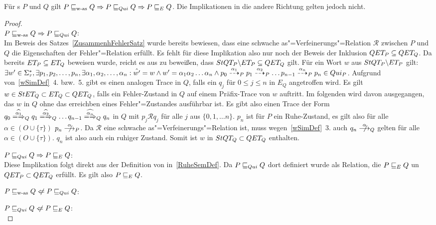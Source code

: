 \begin{Satz}
  Für \MEIO{}s $P$ und $Q$ gilt $P \sqsubseteq _{\mathrm{w}\text{-}\mathrm{as}} Q \Rightarrow P  \sqsubseteq  _{Qui} Q \Rightarrow
  P  \sqsubseteq  _E Q$. Die Implikationen in die andere Richtung gelten jedoch nicht.
\end{Satz}
\begin{proof}\mbox{}\\
  $P \sqsubseteq _{\mathrm{w}\text{-}\mathrm{as}} Q \Rightarrow P  \sqsubseteq  _{Qui} Q$:\\
  Im Beweis des Satzes~\ref{ZusammenhFehlerSatz} wurde bereits bewiesen, dass
  eine schwache as"=Verfeinerungs"=Relation $\mathcal{R}$ zwischen $P$ und $Q$
  die Eigenschaften der Fehler"=Relation \ERel{} erfüllt. Es fehlt für diese
  Implikation also nur noch der Beweis der Inklusion $QET _P \subseteq QET
  _Q$. Da bereits $ET _P\subseteq ET _Q$ beweisen wurde, reicht es aus zu
  beweißen, dass $StQT _P \backslash ET _P\subseteq QET _Q$ gilt. Für ein
  Wort $w$ aus $StQT _P \backslash ET _P$ gilt: $\exists w'\in\Sigma _{\tau}
  ^*, \exists p_1, p_2, \dots , p_n, \exists \alpha _1, \alpha _2, \dots
  ,\alpha _n: \hat{w'} = w \land w' = \alpha _1\alpha _2\dots\alpha _n \land
  p_0 \may[\alpha _1]_P p_1 \may[\alpha _2]_P \dots p_{n-1} \may[\alpha _n]_P
  p_n \in Qui _P$. Aufgrund von~\ref{wSimDef}~4. bzw.~5. gibt es einen analogen
  Trace in $Q$, falls ein $q_j$ für $0\leq j \leq n$ in $E_Q$ angetroffen wird.
  Es gilt $w\in StET _Q\subset ET _Q\subset QET _Q$, falls ein Fehler-Zustand
  in $Q$ auf einem Präfix-Trace von $w$ auftritt. Im folgenden wird davon
  ausgegangen, das $w$ in $Q$ ohne das erreichben eines Fehler"=Zustandes
  ausführbar ist. Es gibt also einen Trace der Form $q_0
  \weakmay[\widehat{\alpha _1}]_Q q_1 \weakmay[\widehat{\alpha _2}]_Q \dots
  q_{n-1} \weakmay[\widehat{\alpha _n}]_Q q_n$ in $Q$ mit $p_j \mathcal{R} q_j$
  für alle $j$ aus $\{0,1,\dots n\}$. $p_n$ ist für $P$ ein Ruhe-Zustand, es
  gilt also für alle $\alpha \in (O\cup \{\tau\})$ $p_n \nmust[\alpha]_P$. Da
  $\mathcal{R}$ eine schwache as"=Verfeinerungs"=Relation ist, muss
  wegen~\ref{wSimDef}~3. auch $q_n \nmust[\alpha]_Q$ gelten für alle $\alpha
  \in (O\cup \{\tau\})$. $q_n$ ist also auch ein ruhiger Zustand. Somit ist $w$
  in $StQT _Q\subset QET _Q$ enthalten.

  $P  \sqsubseteq  _{Qui} Q \Rightarrow P  \sqsubseteq  _E Q$:\\
  Diese Implikation folgt direkt aus der Definition von \QRel{}
  in~\ref{RuheSemDef}. Da $P  \sqsubseteq  _{Qui} Q$ dort definiert wurde als Relation, die
  $P  \sqsubseteq  _E Q$ un $QET _P \subset QET _Q$ erfüllt. Es gilt also $P  \sqsubseteq  _E Q$.

  $P \wasRel Q \hspace{0.1cm}\not\hspace{-0.1cm}\Leftarrow P \QRel Q$:\\

  $P \QRel Q \hspace{0.1cm}\not\hspace{-0.1cm}\Leftarrow P \ERel Q$:\\
\end{proof}

